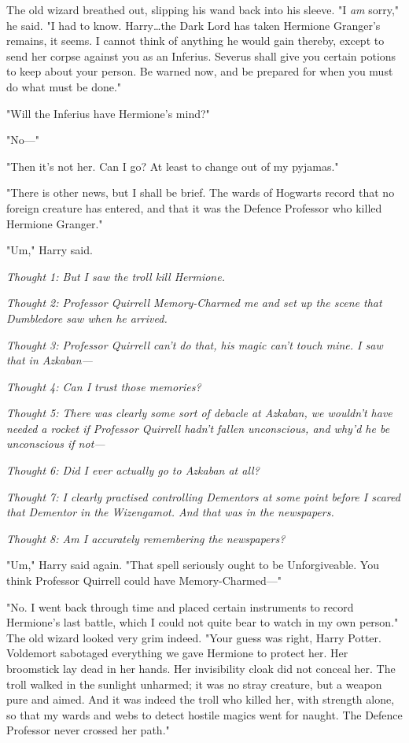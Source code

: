 The old wizard breathed out, slipping his wand back into his sleeve. "I
\emph{am} sorry," he said. "I had to know. Harry…the Dark Lord has
taken Hermione Granger's remains, it seems. I cannot think of anything he would
gain thereby, except to send her corpse against you as an Inferius. Severus
shall give you certain potions to keep about your person. Be warned now, and be
prepared for when you must do what must be done."

"Will the Inferius have Hermione's mind?"

"No—"

"Then it's not her. Can I go? At least to change out of my pyjamas."

"There is other news, but I shall be brief. The wards of Hogwarts record that
no foreign creature has entered, and that it was the Defence Professor who
killed Hermione Granger."

"Um," Harry said.

\emph{Thought 1: But I saw the troll kill Hermione.}

\emph{Thought 2: Professor Quirrell Memory-Charmed me and set up the scene that
Dumbledore saw when he arrived.}

\emph{Thought 3: Professor Quirrell can't do that, his magic can't touch mine.
I saw that in Azkaban—}

\emph{Thought 4: Can I trust those memories?}

\emph{Thought 5: There was clearly some sort of debacle at Azkaban, we wouldn't
have needed a rocket if Professor Quirrell hadn't fallen unconscious, and why'd
he be unconscious if not—}

\emph{Thought 6: Did I ever actually go to Azkaban at all?}

\emph{Thought 7: I clearly practised controlling Dementors at some point before
I scared that Dementor in the Wizengamot. And \emph{that} was in the
newspapers.}

\emph{Thought 8: Am I accurately remembering the newspapers?}

"Um," Harry said again. "That spell seriously ought to be Unforgiveable. You
think Professor Quirrell could have Memory-Charmed—"

"No. I went back through time and placed certain instruments to record
Hermione's last battle, which I could not quite bear to watch in my own
person." The old wizard looked very grim indeed. "Your guess was right, Harry
Potter. Voldemort sabotaged everything we gave Hermione to protect her. Her
broomstick lay dead in her hands. Her invisibility cloak did not conceal her.
The troll walked in the sunlight unharmed; it was no stray creature, but a
weapon pure and aimed. And it was indeed the troll who killed her, with
strength alone, so that my wards and webs to detect hostile magics went for
naught. The Defence Professor never crossed her path."

